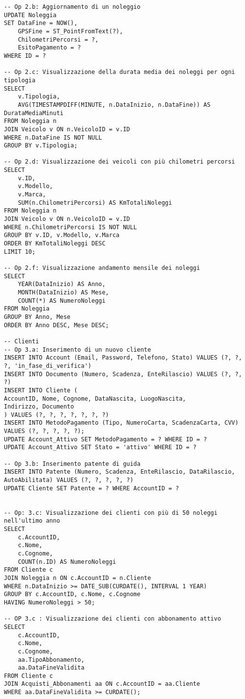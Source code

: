 \documentclass{article}
\begin{document}
\begin{lstlisting}
-- Op 2.b: Aggiornamento di un noleggio
UPDATE Noleggia 
SET DataFine = NOW(), 
	GPSFine = ST_PointFromText(?),
	ChilometriPercorsi = ?, 
	EsitoPagamento = ?
WHERE ID = ?

-- Op 2.c: Visualizzazione della durata media dei noleggi per ogni tipologia
SELECT 
    v.Tipologia,
    AVG(TIMESTAMPDIFF(MINUTE, n.DataInizio, n.DataFine)) AS DurataMediaMinuti
FROM Noleggia n
JOIN Veicolo v ON n.VeicoloID = v.ID
WHERE n.DataFine IS NOT NULL
GROUP BY v.Tipologia;

-- Op 2.d: Visualizzazione dei veicoli con più chilometri percorsi
SELECT 
    v.ID,
    v.Modello,
    v.Marca,
    SUM(n.ChilometriPercorsi) AS KmTotaliNoleggi
FROM Noleggia n
JOIN Veicolo v ON n.VeicoloID = v.ID
WHERE n.ChilometriPercorsi IS NOT NULL
GROUP BY v.ID, v.Modello, v.Marca
ORDER BY KmTotaliNoleggi DESC
LIMIT 10;

-- Op 2.f: Visualizzazione andamento mensile dei noleggi
SELECT 
    YEAR(DataInizio) AS Anno,
    MONTH(DataInizio) AS Mese,
    COUNT(*) AS NumeroNoleggi
FROM Noleggia
GROUP BY Anno, Mese
ORDER BY Anno DESC, Mese DESC;

-- Clienti
-- Op 3.a: Inserimento di un nuovo cliente
INSERT INTO Account (Email, Password, Telefono, Stato) VALUES (?, ?, ?, 'in_fase_di_verifica')
INSERT INTO Documento (Numero, Scadenza, EnteRilascio) VALUES (?, ?, ?)
INSERT INTO Cliente (
AccountID, Nome, Cognome, DataNascita, LuogoNascita,
Indirizzo, Documento
) VALUES (?, ?, ?, ?, ?, ?, ?)
INSERT INTO MetodoPagamento (Tipo, NumeroCarta, ScadenzaCarta, CVV)
VALUES (?, ?, ?, ?, ?);
UPDATE Account_Attivo SET MetodoPagamento = ? WHERE ID = ?
UPDATE Account_Attivo SET Stato = 'attivo' WHERE ID = ?

-- Op 3.b: Inserimento patente di guida
INSERT INTO Patente (Numero, Scadenza, EnteRilascio, DataRilascio, AutoAbilitata) VALUES (?, ?, ?, ?, ?)
UPDATE Cliente SET Patente = ? WHERE AccountID = ?


-- Op: 3.c: Visualizzazione dei clienti con più di 50 noleggi nell'ultimo anno
SELECT 
    c.AccountID,
    c.Nome,
    c.Cognome,
    COUNT(n.ID) AS NumeroNoleggi
FROM Cliente c
JOIN Noleggia n ON c.AccountID = n.Cliente
WHERE n.DataInizio >= DATE_SUB(CURDATE(), INTERVAL 1 YEAR)
GROUP BY c.AccountID, c.Nome, c.Cognome
HAVING NumeroNoleggi > 50;

-- OP 3.c : Visualizzazione dei clienti con abbonamento attivo
SELECT 
    c.AccountID,
    c.Nome,
    c.Cognome,
    aa.TipoAbbonamento,
    aa.DataFineValidita
FROM Cliente c
JOIN Acquisti_Abbonamenti aa ON c.AccountID = aa.Cliente
WHERE aa.DataFineValidita >= CURDATE();


\end{lstlisting}
\end{document}
